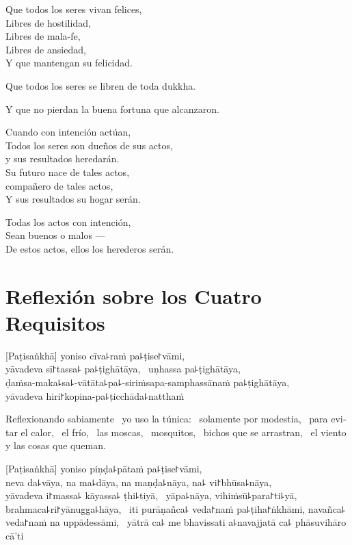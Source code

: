 Que todos los seres vivan felices,\\
Libres de hostilidad,\\
Libres de mala-fe,\\
Libres de ansiedad,\\
Y que mantengan su felicidad.

Que todos los seres se libren de toda dukkha.

Y que no pierdan la buena fortuna que alcanzaron.

Cuando con intención actúan,\\
Todos los seres son dueños de sus actos, \\ 
y sus resultados heredarán.\\
Su futuro nace de tales actos, \\
compañero de tales actos,\\
Y sus resultados su hogar serán.
\enlargethispage{3\baselineskip}

Todas los actos con intención,\\
Sean buenos o malos ---\\
De estos actos, ellos los herederos serán.

\chapter[Cuatro Requisitos]{Reflexión sobre los Cuatro Requisitos}


\begin{leader}
\end{leader}

[Paṭisaṅkhā] yoniso cīva꜕raṁ pa꜕ṭise꜓vāmi, \pause\\
yāvadeva sī꜓tassa꜕ pa꜕ṭighātāya, \pause\ uṇhassa pa꜕ṭighātāya, \pause\\
ḍaṁsa-maka꜕sa꜕-vātāta꜕pa꜕-siriṁsapa-samphassānaṁ pa꜕ṭighātāya, \pause\\
yāvadeva hiri꜓kopina-pa꜕ṭicchāda꜕natthaṁ

\begin{english}
  Reflexionando sabiamente \pause\ yo uso la túnica: \pause\ solamente por modestia, \pause\
  para evitar el calor, \pause\ el frío, \pause\ las moscas, \pause\ mosquitos,
  \pause\ bichos que se arrastran, \pause\ el viento y las cosas que queman.
\end{english}

[Paṭisaṅkhā] yoniso piṇḍa꜕pātaṁ pa꜕ṭise꜓vāmi, \pause\\
neva da꜕vāya, na ma꜕dāya, na maṇḍa꜕nāya, na꜕ vi꜓bhūsa꜕nāya, \pause\\
yāvadeva i꜓massa꜕ kāyassa꜕ ṭhi꜕tiyā, \pause\ yāpa꜕nāya, vihiṁsū꜕para꜓ti꜕yā, \pause\\
brahmaca꜕ri꜓yānugga꜕hāya, \pause\ iti purāṇañca꜕ veda꜓naṁ pa꜕ṭiha꜓ṅkhāmi,
navañca꜕ veda꜓naṁ na uppādessāmi, \pause\ yātrā ca꜕ me bhavissati a꜕navajjatā
ca꜕ phāsuvihāro cā'ti

